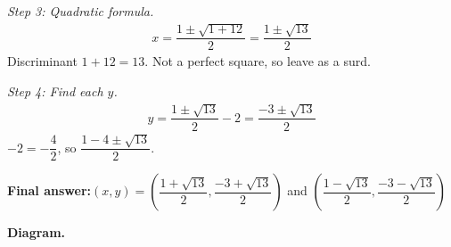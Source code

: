 \documentclass[11pt]{article}
\begin{document}
\textit{Step 3: Quadratic formula.}
\[\begin{gathered}
x = \dfrac{1 \pm \sqrt{1 + 12}}{2} = \dfrac{1 \pm \sqrt{13}}{2}
\end{gathered}\]
Discriminant \( 1 + 12 = 13 \). Not a perfect square, so leave as a surd.

\textit{Step 4: Find each \( y \).}
\[\begin{gathered}
y = \dfrac{1 \pm \sqrt{13}}{2} - 2 = \dfrac{-3 \pm \sqrt{13}}{2}
\end{gathered}\]
\( -2 = -\dfrac{4}{2} \), so \( \dfrac{1 - 4 \pm \sqrt{13}}{2} \).

\begin{answerbox}
\textbf{Final answer:}\quad \(\displaystyle (x, y) = \left(\dfrac{1 + \sqrt{13}}{2}, \dfrac{-3 + \sqrt{13}}{2}\right)\) and \(\displaystyle \left(\dfrac{1 - \sqrt{13}}{2}, \dfrac{-3 - \sqrt{13}}{2}\right)\)
\end{answerbox}
\textbf{Diagram.}
\end{document}
